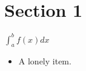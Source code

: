 


\section{Section 1}
\lipsum[1-3]

$ \int_{a}^{b} f(x) d x $

\begin{itemize}
    \item A lonely item.
\end{itemize}











